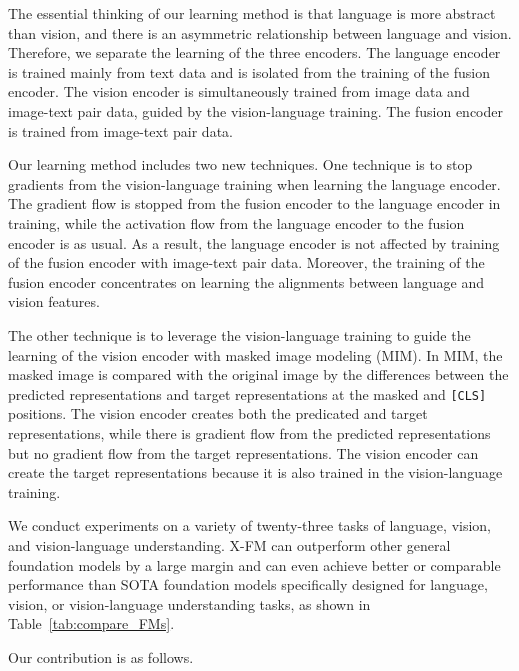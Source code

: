\documentclass[11pt]{article}
\newcommand{\ModelName}{X-FM\xspace}
\begin{document}
The essential thinking of our learning method is that language is more abstract than vision, and there is an asymmetric relationship between language and vision. Therefore, we separate the learning of the three encoders. The language encoder is trained mainly from text data and is isolated from the training of the fusion encoder. The vision encoder is simultaneously trained from image data and image-text pair data, guided by the vision-language training. The fusion encoder is trained from image-text pair data.

Our learning method includes two new techniques. One technique is to stop gradients from the vision-language training when learning the language encoder. The gradient flow is stopped from the fusion encoder to the language encoder in training, while the activation flow from the language encoder to the fusion encoder is as usual. As a result, the language encoder is not affected by training of the fusion encoder with image-text pair data. Moreover, the training of the fusion encoder concentrates on learning the alignments between language and vision features.










The other technique is to leverage the vision-language training to guide the learning of the vision encoder with masked image modeling (MIM). In MIM, the masked image is compared with the original image by the differences between the predicted representations and target representations at the masked and \texttt{[CLS]} positions. The vision encoder creates both the predicated and target representations, while there is gradient flow from the predicted representations but no gradient flow from the target representations. The vision encoder can create the target representations because it is also trained in the vision-language training.





We conduct experiments on a variety of twenty-three tasks of language, vision, and vision-language understanding. {\ModelName} can outperform other general foundation models by a large margin and can even achieve better or comparable performance than SOTA foundation models specifically designed for language, vision, or vision-language understanding tasks, as shown in Table~\ref{tab:compare_FMs}.

Our contribution is as follows.
\end{document}
